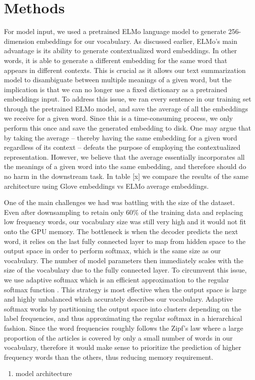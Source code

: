 \section{Methods}
\label{sec: method}


For model input, we used a pretrained ELMo language model \cite{peters2018deep} to generate 256-dimension embeddings for our vocabulary. As discussed earlier, ELMo's main advantage is its ability to generate contextualized word embeddings. In other words, it is able to generate a different embedding for the same word that appears in different contexts. This is crucial as it allows our text summarization model to disambiguate between multiple meanings of a given word, but the implication is that we can no longer use a fixed dictionary as a pretrained embeddings input. To address this issue, we ran every sentence in our training set through the pretrained ELMo model, and save the average of all the embeddings we receive for a given word. Since this is a time-consuming process, we only perform this once and save the generated embedding to disk. One may argue that by taking the average -- thereby having the same embedding for a given word regardless of its context -- defeats the purpose of employing the contextualized representation. However, we believe that the average essentially incorporates all the meanings of a given word into the same embedding, and therefore should do no harm in the downstream task.  In table [x]  we compare the results of the same architecture using Glove embeddings vs ELMo average embeddings. 

One of the main challenges we had was battling with the size of the dataset. Even after downsampling to retain only $60\%$ of the training data and replacing low frequency words, our vocabulary size was still very high and it would not fit onto the GPU memory. The bottleneck is when the decoder predicts the next word, it relies on the last fully connected layer to map from hidden space to the output space in order to perform softmax, which is the same size as our vocabulary. The number of model parameters then immediately scales with the size of the vocabulary due to the fully connected layer. To circumvent this issue, we use adaptive softmax which is an efficient approximation to the regular softmax function \cite{grave2016efficient}. This strategy is most effective when the output space is large and highly unbalanced which accurately describes our vocabulary. Adaptive softmax works by partitioning the output space into clusters depending on the label frequencies, and thus approximating the regular softmax in a hierarchical fashion. Since the word frequencies roughly follows the Zipf's law \cite{wilson1949human} where a large proportion of the articles is covered by only a small number of words in our vocabulary, therefore it would make sense to prioritize the prediction of higher frequency words than the others, thus reducing memory requirement.



\begin{enumerate}
\item model architecture
\end{enumerate} 